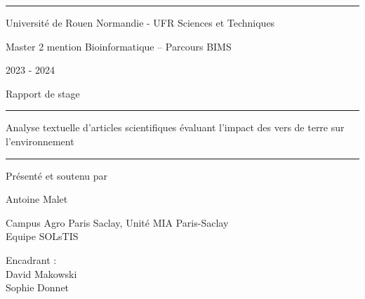 \documentclass{book}
\begin{document}
\vspace{0.5cm}
\hrule
\vspace{0.5cm}

\begin{center}
    \large{Université de Rouen Normandie - UFR Sciences et Techniques}
\end{center}

\begin{center}
    \large{Master 2 mention Bioinformatique – Parcours BIMS}
\end{center}

\begin{center}
    \large{2023 - 2024}
\end{center}

\vspace{1cm}

\begin{center}
    \Large{Rapport de stage}
\end{center}

\begin{center}
    \vspace{1cm}
    \hrule
    \vspace{1cm}
    \huge{Analyse textuelle d'articles scientifiques évaluant l'impact des vers
        de terre sur l'environnement}
    \vspace{1cm}
    \hrule
    \vspace{1cm}
\end{center}

\begin{center}
    \large{Présenté et soutenu par}
\end{center}

\begin{center}
    \huge{Antoine Malet}
\end{center}

\begin{center}
    \vspace{1.5cm}
    \Large{Campus Agro Paris Saclay, Unité MIA Paris-Saclay} \\
    \Large{Equipe SOLsTIS}
\end{center}

\begin{center}
    \vspace{0.5cm}
    \large{Encadrant :} \\
    \vspace{0.5cm}
    \large{David Makowski} \\
    \large{Sophie Donnet}
\end{center}
\end{document}
